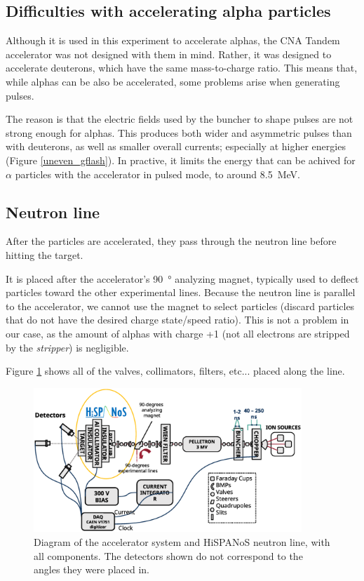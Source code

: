 \documentclass[a4paper,12pt]{report}
\begin{document}
\subsection{Difficulties with accelerating alpha particles}	%
Although it is used in this experiment to accelerate alphas, the CNA Tandem accelerator was not designed with them in mind.
Rather, it was designed to accelerate deuterons, which have the same mass-to-charge ratio.
This means that, while alphas can be also be accelerated, some problems arise when generating pulses.

The reason is that the electric fields used by the buncher to shape pulses are not strong enough for alphas.
This produces both wider and asymmetric pulses than with deuterons, as well as smaller overall currents; especially at higher energies (Figure \ref{uneven_gflash}).
In practive, it limits the energy that can be achived for $\alpha$ particles with the accelerator in pulsed mode, to around \qty{8.5}{\MeV}.
\\

\subsection{Neutron line}
After the particles are accelerated, they pass through the neutron line before hitting the target.

It is placed after the accelerator's \qty{90}{\degree} analyzing magnet, typically used to deflect particles toward the other experimental lines.
Because the neutron line is parallel to the accelerator, we cannot use the magnet to select particles (discard particles that do not have the desired charge state/speed ratio).
This is not a problem in our case, as the amount of alphas with charge +1 (not all electrons are stripped by the \textit{stripper}) is negligible.

Figure \ref{tandemdiagrama} shows all of the valves, collimators, filters, etc... placed along the line.

\begin{figure}[H]
	\centering
	\includegraphics[width=0.90\textwidth]{tandemdiagrama.eps}
	\caption{Diagram of the accelerator system and HiSPANoS neutron line, with all components.
	The detectors shown do not correspond to the angles they were placed in.}
	\label{tandemdiagrama}
\end{figure}
\end{document}
